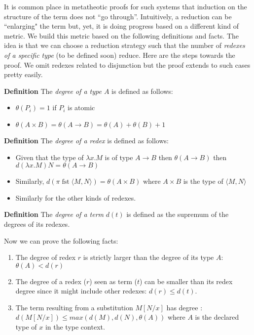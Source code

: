 It is common place in metatheotic proofs for such systems that induction on the structure of the term does not ``go through''. Intuitively, a reduction can be ``enlarging" the term but, yet, it is doing progress based on a different kind of metric. We build this metric based on the following definitions and facts. The idea is that we can choose a reduction strategy such that the number of \textit{redexes of a specific type} (to be defined soon) reduce. Here are the steps towards the proof. We omit redexes related to disjunction but the proof extends to such cases pretty easily.


\begin{mdframed}
	\textbf{Definition}
	The \textit{degree of a type $A$} is defined as follows:
	\begin{itemize}
		\item $\theta(P_i)=1$ if $P_i$ is atomic
		\item $\theta(A\times B)=\theta(A \rightarrow B)= \theta(A)+\theta(B)+1$
	\end{itemize}
\end{mdframed}
\begin{mdframed}
	\textbf{Definition}
	The \textit{degree of a redex} is defined as follows:
	\begin{itemize}
		\item  Given that the type of $\lambda x. M$ is of type $A\rightarrow B$ then $\theta(A\rightarrow B)$ then $d(\lambda x. M)N=\theta(A\rightarrow B)$
		\item Similarly, $d(\pi\operatorname{fst}\langle M, N\rangle)=\theta(A\times B)$
		where $A\times B$ is the type of $\langle M, N\rangle$
		
		\item Similarly for the other kinds of redexes.
	\end{itemize}
\end{mdframed}
\begin{mdframed}
	\textbf{Definition}
	The \textit{degree of a term} $d(t)$ is defined as the supremum of the degrees of its redexes.
\end{mdframed}
Now we can prove the following facts:
\begin{theorem}
	\begin{mdframed}
\begin{enumerate}
	\item The degree of redex $r$ is strictly larger than the degree of its type $A$: 
	$\theta(A)<d(r)$
	\item The degree of a redex ($r$) seen as term ($t$)  can be smaller than its redex degree since it might include other redexes: $d(r)\le d(t)$.
	\item The term resulting from a substitution $M[N/x]$  has degree : $d(M[N/x])\le max(d(M),d(N),\theta(A))$ where $A$ is the declared type of $x$ in the type context.
\end{enumerate}
	\end{mdframed}
\end{theorem}
